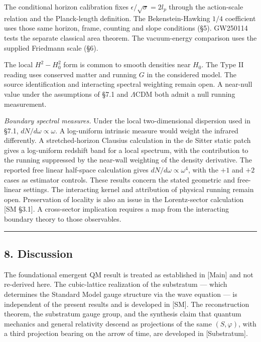 \documentclass[
]{article}
\begin{document}
The conditional horizon calibration fixes
\(\epsilon/\sqrt{\sigma}=2l_p\) through the action-scale relation and
the Planck-length definition. The Bekenstein-Hawking \(1/4\) coefficient
uses those same horizon, frame, counting and slope conditions (§5).
GW250114 tests the separate classical area theorem. The vacuum-energy
comparison uses the supplied Friedmann scale (§6).

The local \(H^2-H_0^2\) form is common to smooth densities near \(H_0\).
The Type II reading uses conserved matter and running \(G\) in the
considered model. The source identification and interacting spectral
weighting remain open. A near-null value under the assumptions of §7.1
and \(\Lambda\)CDM both admit a null running measurement.

\emph{Boundary spectral measures.} Under the local two-dimensional
dispersion used in §7.1, \(dN/d\omega\propto\omega\). A log-uniform
intrinsic measure would weight the infrared differently. A
stretched-horizon Clausius calculation in the de Sitter static patch
gives a log-uniform redshift band for a local spectrum, with the
contribution to the running suppressed by the near-wall weighting of the
density derivative. The reported free linear half-space calculation
gives \(dN/d\omega\propto\omega^4\), with the \(+1\) and \(+2\) cases as
estimator controls. These results concern the stated geometric and
free-linear settings. The interacting kernel and attribution of physical
running remain open. Preservation of locality is also an issue in the
Lorentz-sector calculation {[}SM §3.1{]}. A cross-sector implication
requires a map from the interacting boundary theory to those
observables.

\begin{center}\rule{0.5\linewidth}{0.5pt}\end{center}

\hypertarget{discussion}{%
\subsection{8. Discussion}\label{discussion}}

The foundational emergent QM result is treated as established in
{[}Main{]} and not re-derived here. The cubic-lattice realization of the
substratum --- which determines the Standard Model gauge structure via
the wave equation --- is independent of the present results and is
developed in {[}SM{]}. The reconstruction theorem, the substratum gauge
group, and the synthesis claim that quantum mechanics and general
relativity descend as projections of the same \((S, \varphi)\), with a
third projection bearing on the arrow of time, are developed in
{[}Substratum{]}.
\end{document}
